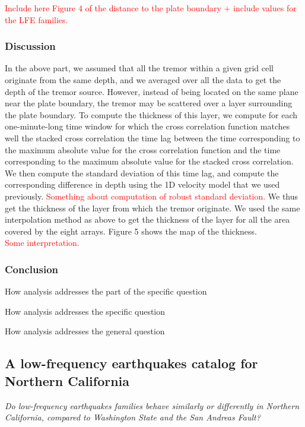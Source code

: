 \documentclass[letterpaper, 12pt]{article}
\begin{document}
\textcolor{red}{Include here Figure 4 of the distance to the plate boundary + include values for the LFE families.} \\

\subsubsection{Discussion}

In the above part, we assumed that all the tremor within a given grid cell originate from the same depth, and we averaged over all the data to get the depth of the tremor source. However, instead of being located on the same plane near the plate boundary, the tremor may be scattered over a layer surrounding the plate boundary. To compute the thickness of this layer, we compute for each one-minute-long time window for which the cross correlation function matches well the stacked cross correlation the time lag between the time corresponding to the maximum absolute value for the cross correlation function and the time corresponding to the maximum absolute value for the stacked cross correlation. We then compute the standard deviation of this time lag, and compute the corresponding difference in depth using the 1D velocity model that we used previously.   \textcolor{red}{Something about computation of robust standard deviation.} We thus get the thickness of the layer from which the tremor originate. We used the same interpolation method as above to get the thickness of the layer for all the area covered by the eight arrays. Figure 5 shows the map of the thickness. \\

\textcolor{red}{Some interpretation.}

\subsubsection{Conclusion}

How analysis addresses the part of the specific question

How analysis addresses the specific question

How analysis addresses the general question

\subsection{A low-frequency earthquakes catalog for Northern California}

\textit{Do low-frequency earthquakes families behave similarly or differently in Northern California, compared to Washington State and the San Andreas Fault?}
\end{document}
